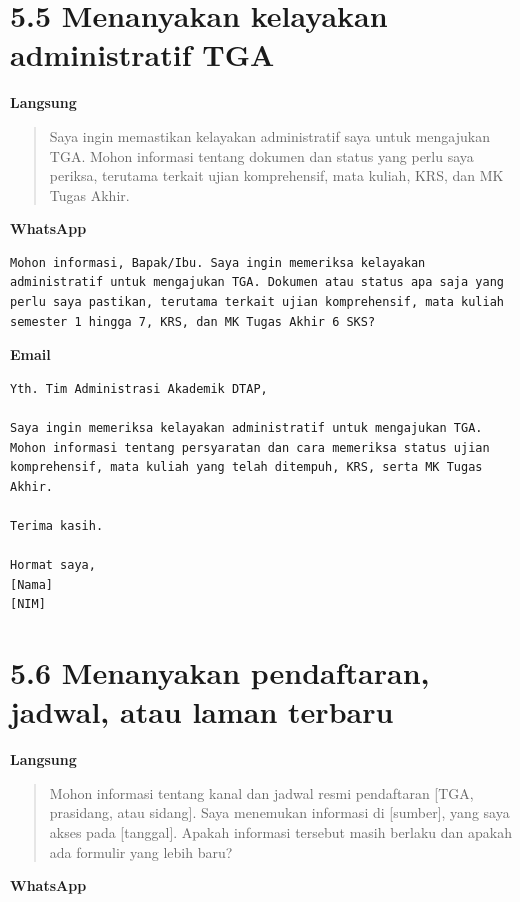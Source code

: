 \documentclass[
  indonesian,
]{article}
\renewcommand{\subsection}{\section}
\begin{document}
\subsection{5.5 Menanyakan kelayakan administratif
TGA}\label{menanyakan-kelayakan-administratif-tga}

\textbf{Langsung}

\begin{quote}
Saya ingin memastikan kelayakan administratif saya untuk mengajukan TGA.
Mohon informasi tentang dokumen dan status yang perlu saya periksa,
terutama terkait ujian komprehensif, mata kuliah, KRS, dan MK Tugas
Akhir.
\end{quote}

\textbf{WhatsApp}

\begin{verbatim}
Mohon informasi, Bapak/Ibu. Saya ingin memeriksa kelayakan administratif untuk mengajukan TGA. Dokumen atau status apa saja yang perlu saya pastikan, terutama terkait ujian komprehensif, mata kuliah semester 1 hingga 7, KRS, dan MK Tugas Akhir 6 SKS?
\end{verbatim}

\textbf{Email}

\begin{verbatim}
Yth. Tim Administrasi Akademik DTAP,

Saya ingin memeriksa kelayakan administratif untuk mengajukan TGA. Mohon informasi tentang persyaratan dan cara memeriksa status ujian komprehensif, mata kuliah yang telah ditempuh, KRS, serta MK Tugas Akhir.

Terima kasih.

Hormat saya,
[Nama]
[NIM]
\end{verbatim}

\subsection{5.6 Menanyakan pendaftaran, jadwal, atau laman
terbaru}\label{menanyakan-pendaftaran-jadwal-atau-laman-terbaru}

\textbf{Langsung}

\begin{quote}
Mohon informasi tentang kanal dan jadwal resmi pendaftaran {[}TGA,
prasidang, atau sidang{]}. Saya menemukan informasi di {[}sumber{]},
yang saya akses pada {[}tanggal{]}. Apakah informasi tersebut masih
berlaku dan apakah ada formulir yang lebih baru?
\end{quote}

\textbf{WhatsApp}
\end{document}
